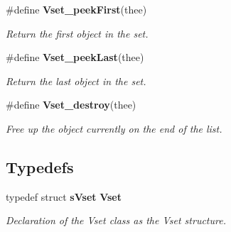 \begin{DoxyCompactItemize}
\#define {\bf Vset\_\-peekFirst}(thee)
\begin{DoxyCompactList}\small\item\em Return the first object in the set. \item\end{DoxyCompactList}\item 
\#define {\bf Vset\_\-peekLast}(thee)
\begin{DoxyCompactList}\small\item\em Return the last object in the set. \item\end{DoxyCompactList}\item 
\#define {\bf Vset\_\-destroy}(thee)
\begin{DoxyCompactList}\small\item\em Free up the object currently on the end of the list. \item\end{DoxyCompactList}\end{DoxyCompactItemize}
\subsection*{Typedefs}
\begin{DoxyCompactItemize}
\item 
typedef struct {\bf sVset} {\bf Vset}
\begin{DoxyCompactList}\small\item\em Declaration of the Vset class as the Vset structure. \item\end{DoxyCompactList}\end{DoxyCompactItemize}
